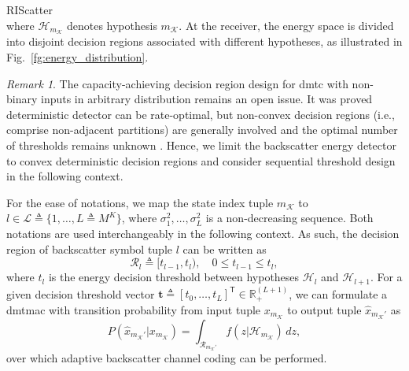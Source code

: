 \documentclass[journal,12pt,onecolumn,draftclsnofoot]{IEEEtran}
\theoremstyle{remark}
\newtheorem{remark}{Remark}
\begin{document}
\begin{section}{RIScatter}
\begin{equation}
		\label{eq:energy_distribution}
	\end{equation}
	where $\mathcal{H}_{m_{\mathcal{K}}}$ denotes hypothesis $m_{\mathcal{K}}$.
	At the receiver, the energy space is divided into disjoint decision regions associated with different hypotheses, as illustrated in Fig.~\ref{fg:energy_distribution}.
	\begin{remark}
		The capacity-achieving decision region design for \gls{dmtc} with non-binary inputs in arbitrary distribution remains an open issue.
		It was proved deterministic detector can be rate-optimal, but non-convex decision regions (i.e., comprise non-adjacent partitions) are generally involved and the optimal number of thresholds remains unknown \cite{Nguyen2018,Nguyen2021}.
		Hence, we limit the backscatter energy detector to convex deterministic decision regions and consider sequential threshold design in the following context.
	\end{remark}

	For the ease of notations, we map the state index tuple $m_{\mathcal{K}}$ to $l \in \mathcal{L} \triangleq \{1,\ldots,L \triangleq M^K\}$, where $\sigma_1^2,\ldots,\sigma_L^2$ is a non-decreasing sequence.
	Both notations are used interchangeably in the following context.
	As such, the decision region of backscatter symbol tuple $l$ can be written as
	\begin{equation}
		\mathcal{R}_{l} \triangleq [t_{l-1},t_l), \quad 0 \le t_{l-1} \le t_l,
	\end{equation}
	where $t_l$ is the energy decision threshold between hypotheses $\mathcal{H}_{l}$ and $\mathcal{H}_{l+1}$.
	For a given decision threshold vector $\boldsymbol{t} \triangleq [t_0,\ldots,t_L]^\mathsf{T} \in \mathbb{R}_+^{(L+1)}$, we can formulate a \gls{dmtmac} with transition probability from input tuple $x_{m_{\mathcal{K}}}$ to output tuple $\hat{x}_{m_{\mathcal{K}}'}$ as
	\begin{equation}
		P(\hat{x}_{m_{\mathcal{K}}'}|x_{m_{\mathcal{K}}}) = \int_{\mathcal{R}_{m_{\mathcal{K}}'}} f(z|\mathcal{H}_{m_{\mathcal{K}}}) \, d z,
		\label{eq:dmtmac}
	\end{equation}
	over which adaptive backscatter channel coding can be performed.
	\label{st:system_model}


\end{section}
\end{document}
